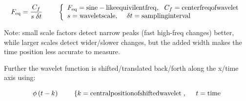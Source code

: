 \documentclass[namedreferences]{solarphysics}
\begin{document}
\begin{article}
\[{F_{{\rm{eq}}}} = \frac{{{C_f}}}{{s\;\delta t}}\;\;\;\;\;\;\;\;\left\{ \begin{array}{l}
{F_{{\rm{eq}}}} = {\rm{sine - like equivilent freq,}}\;\;\;{C_f} = {\rm{center freq of wavelet}}\\
s = {\rm{wavelet scale,}}\;\;\;\;\;\delta t = {\rm{sampling interval}}
\end{array} \right.\]

Note: small scale factors detect narrow peaks (fast high-freq changes) better, while larger scales detect wider/slower changes, but the added width makes the time position less accurate to measure.

Further the wavelet function is shifted/translated back/forth along the x/time axis using:

\[\phi \left( {t - k} \right)\;\;\;\;\;\;\;\;\left\{ {k = {\rm{central position of shifted wavelet}}} \right.,\;\;\;\;\;t = {\rm{time}}\]


\end{article}
\end{document}
